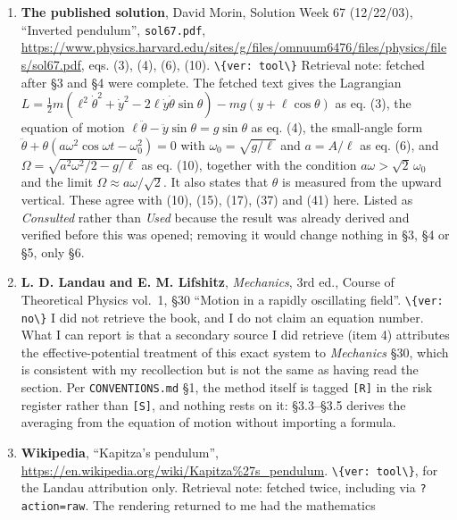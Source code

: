 \documentclass[11pt,a4paper]{article}
\providecommand{\passthrough}[1]{#1}
\providecommand{\tightlist}{\setlength{\itemsep}{0pt}\setlength{\parskip}{0pt}}
\begin{document}
\begin{enumerate}
\def\labelenumi{\arabic{enumi}.}
\setcounter{enumi}{1}
\tightlist
\item
  \textbf{The published solution}, David Morin, Solution Week 67 (12/22/03),
  ``Inverted pendulum'', \passthrough{\lstinline!sol67.pdf!},
  \url{https://www.physics.harvard.edu/sites/g/files/omnuum6476/files/physics/files/sol67.pdf},
  eqs. (3), (4), (6), (10). \passthrough{\lstinline!\{ver: tool\}!} Retrieval note: fetched after §3 and
  §4 were complete. The fetched text gives the Lagrangian
  \(L=\tfrac12 m(\ell^2\dot\theta^2+\dot y^2-2\ell\dot y\dot\theta\sin\theta) -mg(y+\ell\cos\theta)\) as eq. (3), the equation of motion
  \(\ell\ddot\theta-\ddot y\sin\theta=g\sin\theta\) as eq. (4), the small-angle
  form \(\ddot\theta+\theta(a\omega^2\cos\omega t-\omega_0^2)=0\) with
  \(\omega_0=\sqrt{g/\ell}\) and \(a=A/\ell\) as eq. (6), and
  \(\Omega=\sqrt{a^2\omega^2/2-g/\ell}\) as eq. (10), together with the condition
  \(a\omega>\sqrt2\,\omega_0\) and the limit \(\Omega\approx a\omega/\sqrt2\). It
  also states that \(\theta\) is measured from the upward vertical. These agree
  with (10), (15), (17), (37) and (41) here. Listed as \textit{Consulted} rather than
  \textit{Used} because the result was already derived and verified before this was
  opened; removing it would change nothing in §3, §4 or §5, only §6.
\item
  \textbf{L. D. Landau and E. M. Lifshitz}, \textit{Mechanics}, 3rd ed., Course of
  Theoretical Physics vol.~1, §30 ``Motion in a rapidly oscillating field''.
  \passthrough{\lstinline!\{ver: no\}!} I did not retrieve the book, and I do not claim an equation
  number. What I can report is that a secondary source I did retrieve (item 4)
  attributes the effective-potential treatment of this exact system to
  \textit{Mechanics} §30, which is consistent with my recollection but is not the same
  as having read the section. Per \passthrough{\lstinline!CONVENTIONS.md!} §1, the method itself is
  tagged \passthrough{\lstinline![R]!} in the risk register rather than \passthrough{\lstinline![S]!}, and nothing rests on it:
  §3.3--§3.5 derives the averaging from the equation of motion without importing
  a formula.
\item
  \textbf{Wikipedia}, ``Kapitza's pendulum'', \url{https://en.wikipedia.org/wiki/Kapitza\%27s_pendulum}.
  \passthrough{\lstinline!\{ver: tool\}!}, for the Landau attribution only. Retrieval note: fetched twice,
  including via \passthrough{\lstinline!?action=raw!}. The rendering returned to me had the mathematics

\end{enumerate}
\end{document}
